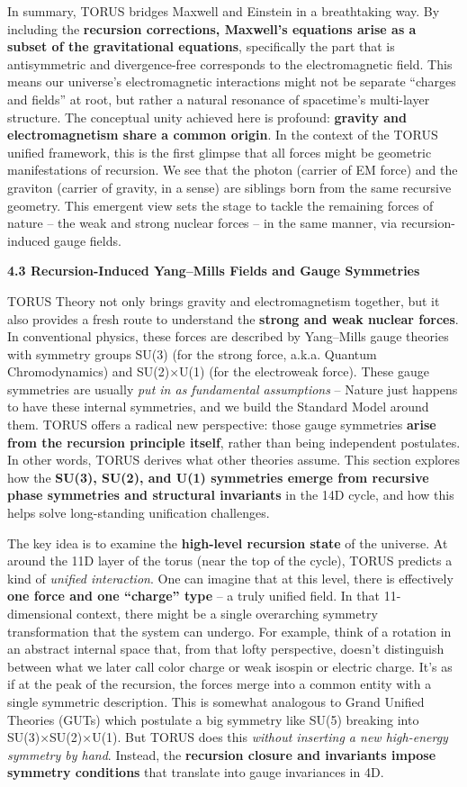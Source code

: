In summary, TORUS bridges Maxwell and Einstein in a breathtaking way. By
including the \textbf{recursion corrections, Maxwell's equations arise
as a subset of the gravitational equations}, specifically the part that
is antisymmetric and divergence-free corresponds to the electromagnetic
field. This means our universe's electromagnetic interactions might not
be separate ``charges and fields'' at root, but rather a natural
resonance of spacetime's multi-layer structure. The conceptual unity
achieved here is profound: \textbf{gravity and electromagnetism share a
common origin}. In the context of the TORUS unified framework, this is
the first glimpse that all forces might be geometric manifestations of
recursion. We see that the photon (carrier of EM force) and the graviton
(carrier of gravity, in a sense) are siblings born from the same
recursive geometry. This emergent view sets the stage to tackle the
remaining forces of nature -- the weak and strong nuclear forces -- in
the same manner, via recursion-induced gauge fields.

\textbf{4.3 Recursion-Induced Yang--Mills Fields and Gauge Symmetries}

TORUS Theory not only brings gravity and electromagnetism together, but
it also provides a fresh route to understand the \textbf{strong and weak
nuclear forces}. In conventional physics, these forces are described by
Yang--Mills gauge theories with symmetry groups SU(3) (for the strong
force, a.k.a. Quantum Chromodynamics) and SU(2)×U(1) (for the
electroweak force). These gauge symmetries are usually \emph{put in as
fundamental assumptions} -- Nature just happens to have these internal
symmetries, and we build the Standard Model around them. TORUS offers a
radical new perspective: those gauge symmetries \textbf{arise from the
recursion principle itself}, rather than being independent postulates.
In other words, TORUS derives what other theories assume. This section
explores how the \textbf{SU(3), SU(2), and U(1) symmetries emerge from
recursive phase symmetries and structural invariants} in the 14D cycle,
and how this helps solve long-standing unification challenges.

The key idea is to examine the \textbf{high-level recursion state} of
the universe. At around the 11D layer of the torus (near the top of the
cycle), TORUS predicts a kind of \emph{unified interaction}. One can
imagine that at this level, there is effectively \textbf{one force and
one ``charge'' type} -- a truly unified field. In that 11-dimensional
context, there might be a single overarching symmetry transformation
that the system can undergo. For example, think of a rotation in an
abstract internal space that, from that lofty perspective, doesn't
distinguish between what we later call color charge or weak isospin or
electric charge​. It's as if at the peak of the recursion, the forces
merge into a common entity with a single symmetric description. This is
somewhat analogous to Grand Unified Theories (GUTs) which postulate a
big symmetry like SU(5) breaking into SU(3)×SU(2)×U(1). But TORUS does
this \emph{without inserting a new high-energy symmetry by hand}.
Instead, the \textbf{recursion closure and invariants impose symmetry
conditions} that translate into gauge invariances in 4D​.

